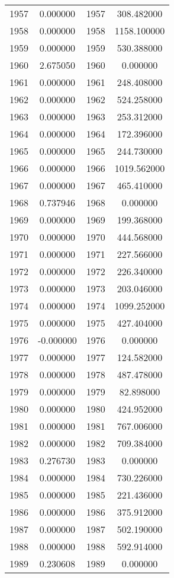 \documentclass[12pt]{article}
\begin{document}
\begin{longtable}{@{}cccc@{}}
1957 & 0.000000 & 1957 & 308.482000 \\
1958 & 0.000000 & 1958 & 1158.100000 \\
1959 & 0.000000 & 1959 & 530.388000 \\
1960 & 2.675050 & 1960 & 0.000000 \\
1961 & 0.000000 & 1961 & 248.408000 \\
1962 & 0.000000 & 1962 & 524.258000 \\
1963 & 0.000000 & 1963 & 253.312000 \\
1964 & 0.000000 & 1964 & 172.396000 \\
1965 & 0.000000 & 1965 & 244.730000 \\
1966 & 0.000000 & 1966 & 1019.562000 \\
1967 & 0.000000 & 1967 & 465.410000 \\
1968 & 0.737946 & 1968 & 0.000000 \\
1969 & 0.000000 & 1969 & 199.368000 \\
1970 & 0.000000 & 1970 & 444.568000 \\
1971 & 0.000000 & 1971 & 227.566000 \\
1972 & 0.000000 & 1972 & 226.340000 \\
1973 & 0.000000 & 1973 & 203.046000 \\
1974 & 0.000000 & 1974 & 1099.252000 \\
1975 & 0.000000 & 1975 & 427.404000 \\
1976 & -0.000000 & 1976 & 0.000000 \\
1977 & 0.000000 & 1977 & 124.582000 \\
1978 & 0.000000 & 1978 & 487.478000 \\
1979 & 0.000000 & 1979 & 82.898000 \\
1980 & 0.000000 & 1980 & 424.952000 \\
1981 & 0.000000 & 1981 & 767.006000 \\
1982 & 0.000000 & 1982 & 709.384000 \\
1983 & 0.276730 & 1983 & 0.000000 \\
1984 & 0.000000 & 1984 & 730.226000 \\
1985 & 0.000000 & 1985 & 221.436000 \\
1986 & 0.000000 & 1986 & 375.912000 \\
1987 & 0.000000 & 1987 & 502.190000 \\
1988 & 0.000000 & 1988 & 592.914000 \\
1989 & 0.230608 & 1989 & 0.000000 \\

\end{longtable}
\end{document}
